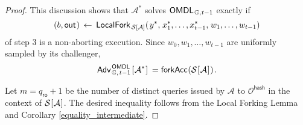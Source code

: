 \documentclass{iacrtrans}
\begin{document}
\begin{proof}
This discussion shows that $\mathcal{A}^*$ solves
$\mathsf{OMDL}
	_{\hspace{1pt}\mathbb{G},\hspace{0.5pt} t-1}$
exactly if
\vspace{5pt}
\begin{equation*}
    		(
				\vspace{1pt}
				b,
				\vspace{1pt}
				\mathsf{out}
				\hspace{0.5pt}
			)
			\hspace{2pt}
			\leftarrow
			\hspace{2pt}
    		\mathsf{LocalFork}_{
				\hspace{1pt}
    			\mathcal{S}
    			\hspace{0pt}[
    				\hspace{0pt}
    				\mathcal{A}
    				\hspace{0pt}
    			]
    		}
			(
   				\hspace{1pt}
				y ^*,
				\hspace{1pt}
				x_1^*, \dots, x_{t-1}^*,
				\hspace{1pt}
				w_1, \dots, w_{t-1}
   			)
\vspace{5pt}
\end{equation*}
\noindent
of step 3 is a non-aborting execution.
Since $w_0, w_1, \dots, w_{t-1}$
are uniformly sampled by its challenger,
\vspace{5pt}
\begin{equation*}
	\mathsf{Adv}
		_{\hspace{1pt}\mathbb{G},\hspace{1pt} t-1}
		^{\hspace{1pt}\mathsf{OMDL}}
		\hspace{1pt}
		[
			\hspace{0.5pt}
			\mathcal{A}^*
			\hspace{0.5pt}
		]
	\hspace{2pt}
	=
	\mathsf{forkAcc}
		\hspace{0.5pt}
		(
			\mathcal{S}
			\hspace{0.5pt}
			[
				\hspace{0.5pt}
				\mathcal{A}
				\hspace{0.5pt}
			]
			\hspace{0.5pt}
		)\hspace{1pt}.
\vspace{5pt}
\end{equation*}

\noindent
Let $m = q_{\mathsf{ro}} + 1$ be the number of distinct
queries issued by $\mathcal{A}$ to $\mathcal{O}^{\mathsf{hash}}$
in the context of
$\mathcal{S}\hspace{0.5pt}[\hspace{0.5pt}\mathcal{A}\hspace{0.5pt}]$.
The desired inequality follows from the
Local Forking Lemma
and Corollary \ref{equality_intermediate}.
\end{proof}
\end{document}
